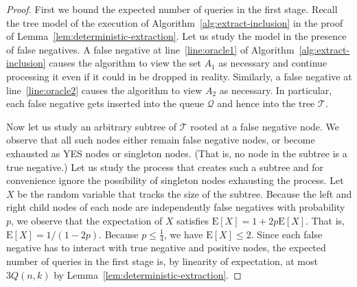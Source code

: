 \documentclass[11pt]{article}
\begin{document}
\begin{proof}
First we bound the expected number of queries in the first stage. 
Recall the tree model of the execution of Algorithm~\ref{alg:extract-inclusion} in the proof of Lemma~\ref{lem:deterministic-extraction}. 
Let us study the model in the presence of false negatives. 
A false negative at line~\ref{line:oracle1} of 
Algorithm~\ref{alg:extract-inclusion} causes the algorithm to view
the set $A_1$ as necessary and continue processing it even if 
it could in be dropped in reality. Similarly, a false negative at 
line~\ref{line:oracle2} causes the algorithm to view $A_2$ as necessary.
In particular, each false negative gets inserted into the queue $\mathcal{Q}$
and hence into the tree $\mathcal{T}$.

Now let us study an arbitrary subtree of $\mathcal{T}$ rooted at a false
negative node. We observe that all such nodes either remain false negative 
nodes, or become exhausted as YES nodes or singleton nodes. (That is, no
node in the subtree is a true negative.) Let us study the process that
creates such a subtree and for convenience ignore the possibility of
singleton nodes exhausting the process. Let $X$ be the random variable 
that tracks the size of the subtree. Because the left and right child 
nodes of each node are independently false negatives with probability $p$, 
we observe that the expectation of $X$ satisfies 
$\mathrm{E}[X]=1+2p\mathrm{E}[X]$. That is, $\mathrm{E}[X]=1/(1-2p)$.
Because $p\leq \frac{1}4$, we have $\mathrm{E}[X]\leq 2$. 
Since each false negative has to interact with true negative and positive
nodes, the expected number of queries in the first stage is, by linearity of
expectation, at most $3Q(n,k)$ by Lemma~\ref{lem:deterministic-extraction}.


\end{proof}
\end{document}

